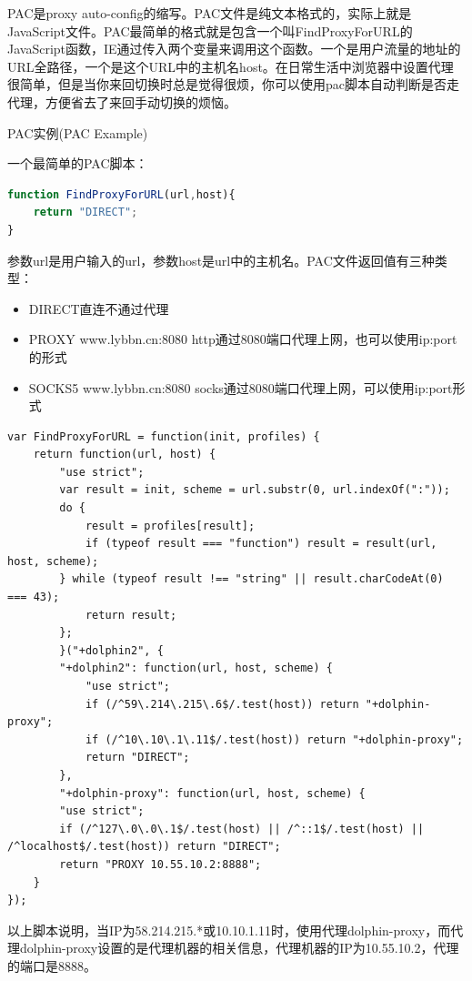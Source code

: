 \documentclass[12pt]{book}
\makeatletter
\numberwithin{dummy}{section}
\theoremstyle{ocrenumbox}
\theoremstyle{blacknumex}
\theoremstyle{blacknumbox}
\theoremstyle{ocrenum}
\renewcommand{\subsection}{\@startsection {subsection}{2}{\z@}
	{-3ex \@plus -0.1ex \@minus -.4ex}
	{0.5ex \@plus.2ex }
	{\normalfont\sffamily\bfseries}}
\makeatother
\begin{document}
PAC是proxy auto-config的缩写。PAC文件是纯文本格式的，实际上就是JavaScript文件。PAC最简单的格式就是包含一个叫FindProxyForURL的JavaScript函数，IE通过传入两个变量来调用这个函数。一个是用户流量的地址的URL全路径，一个是这个URL中的主机名host。在日常生活中浏览器中设置代理很简单，但是当你来回切换时总是觉得很烦，你可以使用pac脚本自动判断是否走代理，方便省去了来回手动切换的烦恼。

\subsection{PAC实例(PAC Example)}

一个最简单的PAC脚本：

\begin{lstlisting}[language=JavaScript]
function FindProxyForURL(url,host){
	return "DIRECT";
}
\end{lstlisting}

参数url是用户输入的url，参数host是url中的主机名。PAC文件返回值有三种类型：

\begin{itemize}
	\item{DIRECT直连不通过代理}
	\item{PROXY www.lybbn.cn:8080 http通过8080端口代理上网，也可以使用ip:port的形式}
	\item{SOCKS5 www.lybbn.cn:8080 socks通过8080端口代理上网，可以使用ip:port形式}
\end{itemize}

\begin{lstlisting}[language=VBScript]
var FindProxyForURL = function(init, profiles) {
	return function(url, host) {
		"use strict";
		var result = init, scheme = url.substr(0, url.indexOf(":"));
		do {
			result = profiles[result];
			if (typeof result === "function") result = result(url, host, scheme);
		} while (typeof result !== "string" || result.charCodeAt(0) === 43);
			return result;
		};
		}("+dolphin2", {
		"+dolphin2": function(url, host, scheme) {
			"use strict";
			if (/^59\.214\.215\.6$/.test(host)) return "+dolphin-proxy";
			if (/^10\.10\.1\.11$/.test(host)) return "+dolphin-proxy";
			return "DIRECT";
		},
		"+dolphin-proxy": function(url, host, scheme) {
		"use strict";
		if (/^127\.0\.0\.1$/.test(host) || /^::1$/.test(host) || /^localhost$/.test(host)) return "DIRECT";
		return "PROXY 10.55.10.2:8888";
	}
});
\end{lstlisting}

以上脚本说明，当IP为58.214.215.*或10.10.1.11时，使用代理dolphin-proxy，而代理dolphin-proxy设置的是代理机器的相关信息，代理机器的IP为10.55.10.2，代理的端口是8888。
\end{document}
